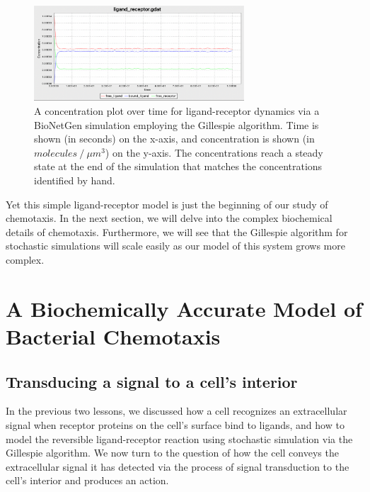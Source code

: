 \begin{figure}[h]
\centering
\mySfFamily
\includegraphics[width = 0.7\textwidth]{../images/chemotaxis_tutorial4_ssa.png}
\caption{A concentration plot over time for ligand-receptor dynamics via a BioNetGen simulation employing the Gillespie algorithm. Time is shown (in seconds) on the x-axis, and concentration is shown (in $molecules\mathbin{/}\mu m^3$) on the y-axis. The concentrations reach a steady state at the end of the simulation that matches the concentrations identified by hand.}
\label{fig:chemotaxis_tutorial4_ssa}
\end{figure}

Yet this simple ligand-receptor model is just the beginning of our study of chemotaxis. In the next section, we will delve into the complex biochemical details of chemotaxis. Furthermore, we will see that the Gillespie algorithm for stochastic simulations will scale easily as our model of this system grows more complex.

\FloatBarrier
{}

\section{A Biochemically Accurate Model of Bacterial Chemotaxis}
\label{sec:a_biochemically_accurate_model_of_bacterial_chemotaxis}

\subsection{Transducing a signal to a cell's interior}

In the previous two lessons, we discussed how a cell recognizes an extracellular signal when receptor proteins on the cell's surface bind to ligands, and how to model the reversible ligand-receptor reaction using stochastic simulation via the Gillespie algorithm. We now turn to the question of how the cell conveys the extracellular signal it has detected via the process of signal transduction to the cell's interior and produces an action.


